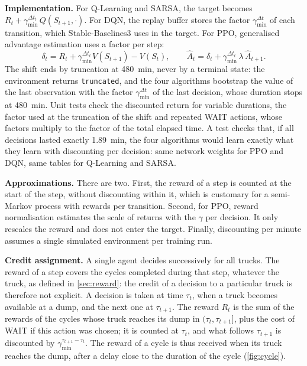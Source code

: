 \documentclass[11pt,a4paper]{article}
\newif\ifrevmarks
\newcommand{\revtag}[1]{\ifrevmarks\textsuperscript{\textcolor{red!70!black}{\scriptsize[#1]}}\fi}
\newenvironment{revbloc}[1]{\par\ifrevmarks\color{revcolor}\noindent\revtag{#1}\ \fi}{\par}
\newif\ifcorrmarks
\newcommand{\corr}[1]{\ifcorrmarks\textcolor{corrcolor}{#1}\else#1\fi}
\begin{document}
\begin{revbloc}{M9, v3}
\textbf{Implementation.} For Q-Learning and SARSA, the target becomes $R_t + \gamma_{\min}^{\Delta t_t}\, Q(S_{t+1}, \cdot)$. For DQN, the replay buffer stores the factor $\gamma_{\min}^{\Delta t}$ of each transition, which Stable-Baselines3 uses in the target. For PPO, generalised advantage estimation uses a factor per step:
\begin{equation}
\delta_t = R_t + \gamma_{\min}^{\Delta t_t} V(S_{t+1}) - V(S_t), \qquad
\hat{A}_t = \delta_t + \gamma_{\min}^{\Delta t_t}\, \lambda\, \hat{A}_{t+1} .
\end{equation}
\corr{The shift ends by truncation at 480~min, never by a terminal state: the environment returns \texttt{truncated}, and the four algorithms bootstrap the value of the last observation with the factor $\gamma_{\min}^{\Delta t}$ of the last decision, whose duration stops at 480~min.} \corr{Unit tests check the discounted return for variable durations, the factor used at the truncation of the shift and repeated WAIT actions, whose factors multiply to the factor of the total elapsed time.} A test checks that, if all decisions lasted exactly 1.89~min, the four algorithms would learn exactly what they learn with discounting per decision: same network weights for PPO and DQN, same tables for Q-Learning and SARSA.

\textbf{Approximations.} There are two. First, the reward of a step is counted at the start of the step, without discounting within it, which is customary for a semi-Markov process with rewards per transition. Second, for PPO, reward normalisation estimates the scale of returns with the $\gamma$ per decision. It only rescales the reward and does not enter the target. Finally, discounting per minute assumes a single simulated environment per training run.

\textbf{Credit assignment.} A single agent decides successively for all trucks. The reward of a step covers the cycles completed during that step, whatever the truck, as defined in \cref{sec:reward}: the credit of a decision to a particular truck is therefore not explicit. \corr{A decision is taken at time $\tau_t$, when a truck becomes available at a dump, and the next one at $\tau_{t+1}$. The reward $R_t$ is the sum of the rewards of the cycles whose truck reaches its dump in $(\tau_t, \tau_{t+1}]$, plus the cost of WAIT if this action was chosen; it is counted at $\tau_t$, and what follows $\tau_{t+1}$ is discounted by $\gamma_{\min}^{\tau_{t+1}-\tau_t}$. The reward of a cycle is thus received when its truck reaches the dump, after a delay close to the duration of the cycle (\cref{fig:cycle}).}
\end{revbloc}
\end{document}
